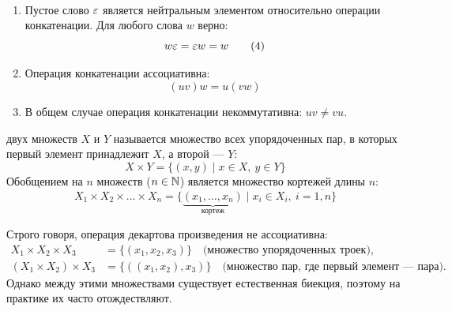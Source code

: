 \begin{properties} ~
    \begin{enumerate}
        \item Пустое слово $\varepsilon$ является нейтральным элементом 
        относительно операции конкатенации. Для любого слова $w$ верно:
        \begin{equation} \label{eq:concat_id}
            w \varepsilon = \varepsilon w = w \tag{4}
        \end{equation}
        \item Операция конкатенации ассоциативна:
        \begin{equation} \label{eq:concat_assoc}
            (u v) w = u (v w) \tag{5}
        \end{equation}
        \item В общем случае операция конкатенации некоммутативна: 
        $u v \neq v u$.
    \end{enumerate}
\end{properties}

\begin{definition}
     двух множеств $X$ и $Y$ 
    называется множество всех упорядоченных пар, в которых первый элемент 
    принадлежит $X$, а второй --- $Y$:
    \[
        X \times Y = \{(x, y) \mid x \in X, \ y \in Y\}
    \]
    Обобщением на $n$ множеств ($n \in \mathbb{N}$) является множество кортежей 
    длины $n$:
    \begin{equation} \label{eq:cart_prod_n}
        X_1 \times X_2 \times \dots \times X_n = 
        \{\underbrace{(x_1, \dots, x_n)}_{\text{кортеж}} \mid 
        x_i \in X_i, \ i = \overline{1, n}\} \tag{6}
    \end{equation}
\end{definition}

\begin{remark}
    Строго говоря, операция декартова произведения не ассоциативна:
    \begin{align*}
        X_1 \times X_2 \times X_3 &= \{(x_1, x_2, x_3)\} 
        \quad \text{(множество упорядоченных троек)}, \\
        (X_1 \times X_2) \times X_3 &= \{((x_1, x_2), x_3)\} 
        \quad \text{(множество пар, где первый элемент --- пара)}.
    \end{align*}
    Однако между этими множествами существует естественная биекция, поэтому 
    на практике их часто отождествляют.
\end{remark}

